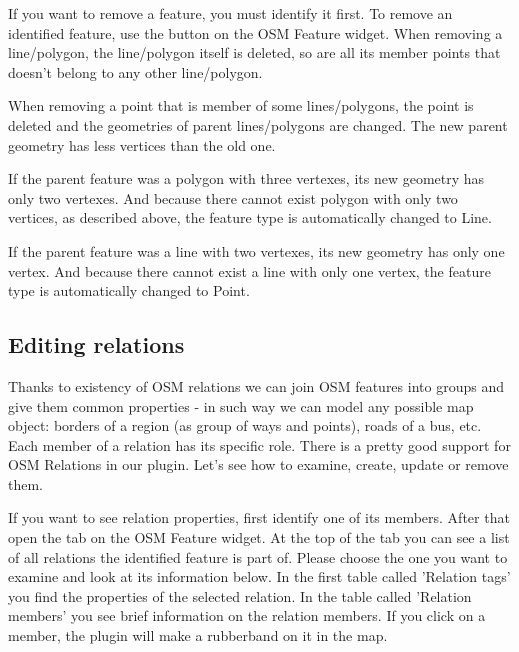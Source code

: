 
If you want to remove a feature, you must identify it first. To remove 
an identified feature, use the  button on the OSM Feature widget. When removing a line/polygon, 
the line/polygon itself is deleted, so are all its member points that 
doesn't belong to any other line/polygon. 

When removing a point that is member of some lines/polygons, the point is 
deleted and the geometries of parent lines/polygons are changed. The new 
parent geometry has less vertices than the old one.

If the parent feature was a polygon with three vertexes, its new geometry 
has only two vertexes. And because there cannot exist polygon with only two 
vertices, as described above, the feature type is automatically changed to 
Line.

If the parent feature was a line with two vertexes, its new geometry has 
only one vertex. And because there cannot exist a line with only one vertex, 
the feature type is automatically changed to Point.

\subsection{Editing relations}\label{editing_osm_relation}

Thanks to existency of OSM relations we can join OSM features into groups and
give them common properties - in such way we can model any possible map
object: borders of a region (as group of ways and points), roads of a bus,
etc. Each member of a relation has its specific role. There is a pretty good 
support for OSM Relations in our plugin. Let's see how to examine, create, 
update or remove them.

\label{examrelation}

If you want to see relation properties, first identify one of its members.
After that open the  tab on the OSM Feature widget. At the 
top of the tab you can see a list of all relations the identified feature 
is part of. Please choose the one you want to examine and look at its 
information below. In the first table called 'Relation tags' you find the 
properties of the selected relation. In the table called 'Relation members' 
you see brief information on the relation members. If you click on a member, 
the plugin will make a rubberband on it in the map.

